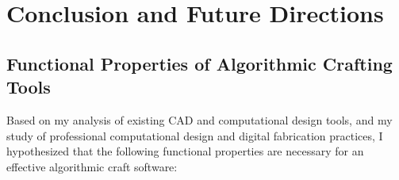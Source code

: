 \chapter{Conclusion and Future Directions}
	\section{Functional Properties of Algorithmic Crafting Tools}
	Based on my analysis of existing CAD and computational design tools, and my study of professional computational design and digital fabrication practices, I hypothesized that the following functional properties are necessary for an effective algorithmic craft software:
